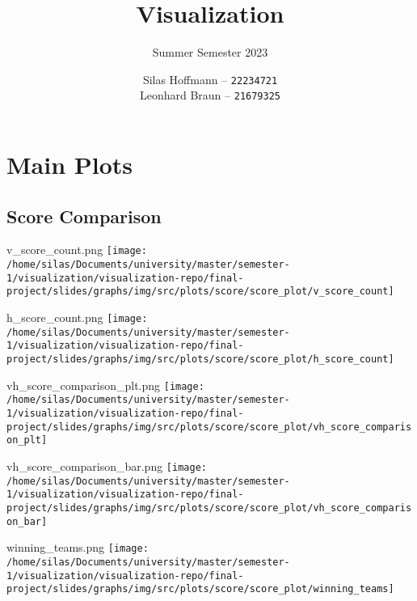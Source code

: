 \documentclass[pdf]{beamer}
\title{Visualization}
\subtitle{Summer Semester 2023}
\author{
    Silas Hoffmann --
    \texttt{22234721} \\
    Leonhard Braun --
    \texttt{21679325} \\
}
\institute{Georg-August-Universität Göttingen}
\begin{document}
\maketitle

\section{Main Plots}
\subsection{Score Comparison}
\begin{frame}{v\_score\_count.png}
	\centering
	\texttt{[image: /home/silas/Documents/university/master/semester-1/visualization/visualization-repo/final-project/slides/graphs/img/src/plots/score/score\_plot/v\_score\_count]}
\end{frame}
\begin{frame}{h\_score\_count.png}
	\centering
	\texttt{[image: /home/silas/Documents/university/master/semester-1/visualization/visualization-repo/final-project/slides/graphs/img/src/plots/score/score\_plot/h\_score\_count]}
\end{frame}
\begin{frame}{vh\_score\_comparison\_plt.png}
	\centering
	\texttt{[image: /home/silas/Documents/university/master/semester-1/visualization/visualization-repo/final-project/slides/graphs/img/src/plots/score/score\_plot/vh\_score\_comparison\_plt]}
\end{frame}
\begin{frame}{vh\_score\_comparison\_bar.png}
	\centering
	\texttt{[image: /home/silas/Documents/university/master/semester-1/visualization/visualization-repo/final-project/slides/graphs/img/src/plots/score/score\_plot/vh\_score\_comparison\_bar]}
\end{frame}
\begin{frame}{winning\_teams.png}
	\centering
	\texttt{[image: /home/silas/Documents/university/master/semester-1/visualization/visualization-repo/final-project/slides/graphs/img/src/plots/score/score\_plot/winning\_teams]}
\end{frame}
\end{document}
